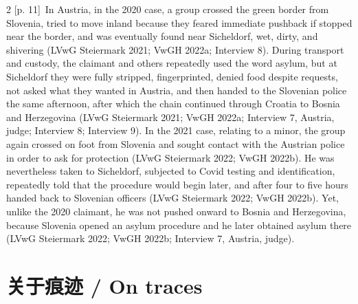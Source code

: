 \documentclass[10pt,a4paper]{article}
\begin{document}
\begin{paracol}{2}
\switchcolumn
{\scriptsize\color{gray} [p. 11]}\ In Austria, in the 2020 case, a group crossed the green border from Slovenia, tried to move inland because they feared immediate pushback if stopped near the border, and was eventually found near Sicheldorf, wet, dirty, and shivering (LVwG Steiermark 2021; VwGH 2022a; Interview 8). During transport and custody, the claimant and others repeatedly used the word asylum, but at Sicheldorf they were fully stripped, fingerprinted, denied food despite requests, not asked what they wanted in Austria, and then handed to the Slovenian police the same afternoon, after which the chain continued through Croatia to Bosnia and Herzegovina (LVwG Steiermark 2021; VwGH 2022a; Interview 7, Austria, judge; Interview 8; Interview 9). In the 2021 case, relating to a minor, the group again crossed on foot from Slovenia and sought contact with the Austrian police in order to ask for protection (LVwG Steiermark 2022; VwGH 2022b). He was nevertheless taken to Sicheldorf, subjected to Covid testing and identification, repeatedly told that the procedure would begin later, and after four to five hours handed back to Slovenian officers (LVwG Steiermark 2022; VwGH 2022b). Yet, unlike the 2020 claimant, he was not pushed onward to Bosnia and Herzegovina, because Slovenia opened an asylum procedure and he later obtained asylum there (LVwG Steiermark 2022; VwGH 2022b; Interview 7, Austria, judge).\par
\switchcolumn*
\end{paracol}
\section*{关于痕迹 / On traces}
\end{document}
